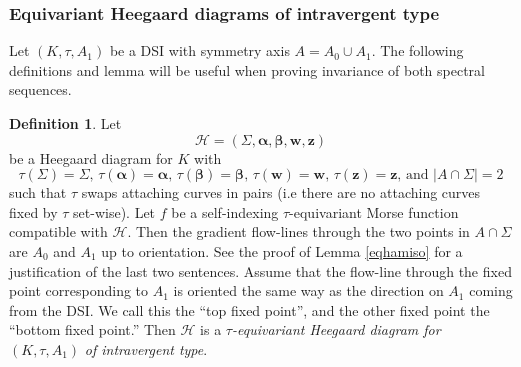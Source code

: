 \documentclass[11pt]{amsart}
\theoremstyle{definition}
\newtheorem{definition}[theorem]{Definition}
\theoremstyle{remark}
\numberwithin{equation}{section}
\begin{document}
\subsubsection{Equivariant Heegaard diagrams of intravergent type}
Let $(K,\tau,A_1)$ be a DSI with symmetry axis $A=A_0\cup A_1$. The following definitions and lemma will be useful when proving invariance of both spectral sequences.

\begin{definition}Let  \[\mathcal{H}=(\Sigma,\bm{\alpha},\bm{\beta}, \bm{w}, \bm{z})\] be a Heegaard diagram for $K$  with 
\[\tau(\Sigma)=\Sigma\textrm{, }
    \tau( \bm{\alpha})=\bm{\alpha}\textrm{, }
   \tau(\bm{\beta})=\bm{\beta}\textrm{, }
    \tau(\bm{w})=\bm{w}\textrm{, }
    \tau(\bm{z})=\bm{z}\textrm{, and }  
    |A\cap \Sigma|=2\]
such that $\tau$ swaps attaching curves in pairs (i.e there are no attaching curves fixed by $\tau$ set-wise). Let $f$ be a self-indexing $\tau$-equivariant Morse function compatible with $\mathcal{H}$. Then the gradient flow-lines through the two points in $A\cap \Sigma$ are $A_0$ and $A_1$ up to orientation. See the proof of Lemma \ref{eqhamiso} for a justification of the last two sentences. Assume that the flow-line through the fixed point corresponding to $A_1$ is oriented the same way as the direction on $A_1$ coming from the DSI. We call this the ``top fixed point'', and the other fixed point the ``bottom fixed point.'' Then $\mathcal{H}$ is a $\tau$\emph{-equivariant Heegaard diagram for} $(K,\tau,A_1)$ \emph{of intravergent type}. 
\end{definition}
\end{document}
